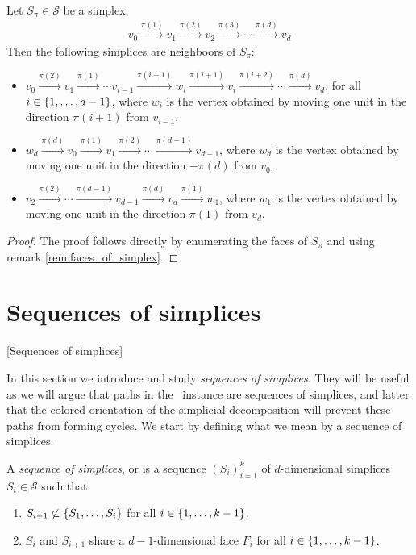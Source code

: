 \begin{lemma}
	Let $S_{\pi} \in \mathcal{S}$ be a simplex:
	\begin{align*}
		v_0 \xrightarrow{\pi(1)} v_1 \xrightarrow{\pi(2)} v_2 \xrightarrow{\pi(3)} \cdots \xrightarrow{\pi(d)} v_d
	\end{align*}
	Then the following simplices are neighboors of $S_{\pi}$:
	\begin{itemize}
		\item $v_0 \xrightarrow{\pi(2)} v_1 \xrightarrow{\pi(1)} \cdots v_{i-1} \xrightarrow{\pi(i+1)} w_i \xrightarrow{\pi(i+1)} v_{i} \xrightarrow{\pi(i+2)} \cdots \xrightarrow{\pi(d)} v_d$, for all $i \in \left\{1, \dots, d-1\right\}$, where $w_i$ is the vertex obtained by moving one unit in the direction $\pi(i+1)$ from $v_{i-1}$.
		\item $w_d \xrightarrow{\pi(d)} v_0 \xrightarrow{\pi(1)} v_1 \xrightarrow{\pi(2)} \cdots \xrightarrow{\pi(d-1)} v_{d-1}$, where $w_d$ is the vertex obtained by moving one unit in the direction $-\pi(d)$ from $v_{0}$.
		\item $v_2 \xrightarrow{\pi(2)} \cdots \xrightarrow{\pi(d-1)} v_{d-1} \xrightarrow{\pi(d)} v_d \xrightarrow{\pi(1)} w_1$, where $w_1$ is the vertex obtained by moving one unit in the direction $\pi(1)$ from $v_d$.
	\end{itemize}
\end{lemma}
\begin{proof}
	The proof follows directly by enumerating the faces of $S_{\pi}$ and using remark \ref{rem:faces_of_simplex}.
\end{proof}

\section{Sequences of simplices}[Sequences of simplices]

In this section we introduce and study \emph{sequences of simplices}. They will be useful as we will argue that paths in the \EndOfLine\ instance are sequences of simplices, and latter that the colored orientation of the simplicial decomposition will prevent these paths from forming cycles. We start by defining what we mean by a sequence of simplices.

\begin{definition}
	\label{def:sequence_of_simplices}
	A \emph{sequence of simplices}, or  is a sequence $\left(S_i\right)_{i=1}^{k}$ of $d$-dimensional simplices $S_i \in \mathcal{S}$ such that:
	\begin{enumerate}
		\item $S_{i+1} \not\subset \left\{S_1, \dots, S_i\right\}$ for all $i \in \left\{1, \dots, k-1\right\}$.
		\item $S_i$ and $S_{i+1}$ share a $d-1$-dimensional face $F_i$ for all $i \in \left\{1, \dots, k-1\right\}$.
	\end{enumerate}
\end{definition}


